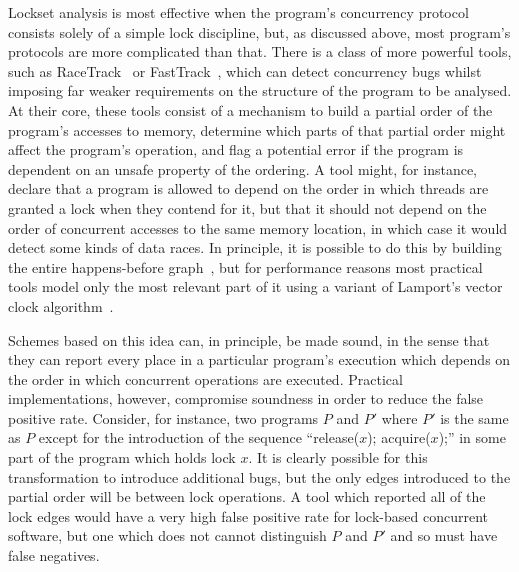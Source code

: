 Lockset analysis is most effective when the program's concurrency
protocol consists solely of a simple lock discipline, but, as
discussed above, most program's protocols are more complicated than
that.  There is a class of more powerful tools, such as
RaceTrack~\cite{Yu2005} or FastTrack~\cite{Flanagan2009}, which can
detect concurrency bugs whilst imposing far weaker requirements on the
structure of the program to be analysed.  At their core, these tools
consist of a mechanism to build a partial order of the program's
accesses to memory, determine which parts of that partial order might
affect the program's operation, and flag a potential error if the
program is dependent on an unsafe property of the ordering.  A tool
might, for instance, declare that a program is allowed to depend on
the order in which threads are granted a lock when they contend for
it, but that it should not depend on the order of concurrent accesses
to the same memory location, in which case it would detect some kinds
of data races.  In principle, it is possible to do this by building
the entire happens-before graph~\cite{Netzer1991}, but for performance
reasons most practical tools model only the most relevant part of it
using a variant of Lamport's vector clock
algorithm~\cite{Lamport1978}.

Schemes based on this idea can, in principle, be made sound, in the
sense that they can report every place in a particular program's
execution which depends on the order in which concurrent operations
are executed.  Practical implementations, however, compromise
soundness in order to reduce the false positive rate.  Consider, for
instance, two programs $P$ and $P'$ where $P'$ is the same as $P$
except for the introduction of the sequence ``release($x$);
acquire($x$);'' in some part of the program which holds lock $x$.  It
is clearly possible for this transformation to introduce additional
bugs, but the only edges introduced to the partial order will be
between lock operations.  A tool which reported all of the lock edges
would have a very high false positive rate for lock-based concurrent
software, but one which does not cannot distinguish $P$ and $P'$ and
so must have false negatives.

